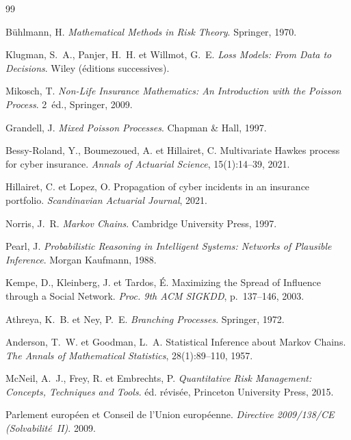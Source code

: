\documentclass[11pt,a4paper]{article}
\begin{document}
\begin{thebibliography}{99}

Bühlmann, H.
\emph{Mathematical Methods in Risk Theory}. Springer, 1970.

Klugman, S.~A., Panjer, H.~H. et Willmot, G.~E.
\emph{Loss Models: From Data to Decisions}. Wiley (éditions successives).

Mikosch, T.
\emph{Non-Life Insurance Mathematics: An Introduction with the Poisson Process}.
2\ieme\ éd., Springer, 2009.

Grandell, J.
\emph{Mixed Poisson Processes}. Chapman \& Hall, 1997.

Bessy-Roland, Y., Boumezoued, A. et Hillairet, C.
\og Multivariate Hawkes process for cyber insurance\fg{}.
\emph{Annals of Actuarial Science}, 15(1):14--39, 2021.

Hillairet, C. et Lopez, O.
\og Propagation of cyber incidents in an insurance portfolio\fg{}.
\emph{Scandinavian Actuarial Journal}, 2021.

Norris, J.~R.
\emph{Markov Chains}. Cambridge University Press, 1997.

Pearl, J.
\emph{Probabilistic Reasoning in Intelligent Systems: Networks of Plausible Inference}.
Morgan Kaufmann, 1988.

Kempe, D., Kleinberg, J. et Tardos, {\'E}.
\og Maximizing the Spread of Influence through a Social Network\fg{}.
\emph{Proc. 9th ACM SIGKDD}, p.~137--146, 2003.

Athreya, K.~B. et Ney, P.~E.
\emph{Branching Processes}. Springer, 1972.

Anderson, T.~W. et Goodman, L.~A.
\og Statistical Inference about Markov Chains\fg{}.
\emph{The Annals of Mathematical Statistics}, 28(1):89--110, 1957.

McNeil, A.~J., Frey, R. et Embrechts, P.
\emph{Quantitative Risk Management: Concepts, Techniques and Tools}.
éd. révisée, Princeton University Press, 2015.

Parlement européen et Conseil de l'Union européenne.
\emph{Directive 2009/138/CE (Solvabilité~II)}. 2009.

\end{thebibliography}
\end{document}
